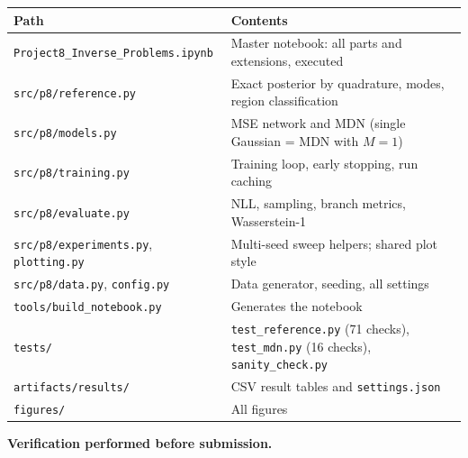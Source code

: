 \documentclass[11pt,a4paper]{article}
\begin{document}
\begin{table}[H]
\centering\small
\begin{tabularx}{\linewidth}{>{\raggedright\arraybackslash}X>{\raggedright\arraybackslash}X}
\toprule
\textbf{Path} & \textbf{Contents} \\
\midrule
\texttt{Project8\_\allowbreak{}Inverse\_\allowbreak{}Problems.ipynb} & Master notebook: all parts and extensions, executed \\
\texttt{src/\allowbreak{}p8/\allowbreak{}reference.py} & Exact posterior by quadrature, modes, region classification \\
\texttt{src/\allowbreak{}p8/\allowbreak{}models.py} & MSE network and MDN (single Gaussian = MDN with $M = 1$) \\
\texttt{src/\allowbreak{}p8/\allowbreak{}training.py} & Training loop, early stopping, run caching \\
\texttt{src/\allowbreak{}p8/\allowbreak{}evaluate.py} & NLL, sampling, branch metrics, Wasserstein-1 \\
\texttt{src/\allowbreak{}p8/\allowbreak{}experiments.py}, \texttt{plotting.py} & Multi-seed sweep helpers; shared plot style \\
\texttt{src/\allowbreak{}p8/\allowbreak{}data.py}, \texttt{config.py} & Data generator, seeding, all settings \\
\texttt{tools/\allowbreak{}build\_\allowbreak{}notebook.py} & Generates the notebook \\
\texttt{tests/\allowbreak{}} & \texttt{test\_\allowbreak{}reference.py} (71 checks), \texttt{test\_\allowbreak{}mdn.py} (16 checks), \texttt{sanity\_\allowbreak{}check.py} \\
\texttt{artifacts/\allowbreak{}results/\allowbreak{}} & CSV result tables and \texttt{settings.json} \\
\texttt{figures/\allowbreak{}} & All figures \\
\bottomrule
\end{tabularx}
\end{table}

\textbf{Verification performed before submission.}
\end{document}
